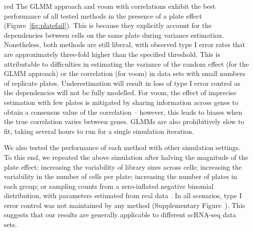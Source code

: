 \documentclass[oupdraft]{bio}
\begin{document}
\begin{color}{red}
The GLMM approach and voom with correlations exhibit the best performance of all tested methods in the presence of a plate effect (Figure~\ref{fig:platefail}).
This is because they explicitly account for the dependencies between cells on the same plate during variance estimation.
Nonetheless, both methods are still liberal, with observed type I error rates that are approximately three-fold higher than the specified threshold.
This is attributable to difficulties in estimating the variance of the random effect (for the GLMM approach) or the correlation (for voom) in data sets with small numbers of replicate plates.
Underestimation will result in loss of type I error control as the dependencies will not be fully modelled.
For voom, the effect of imprecise estimation with few plates is mitigated by sharing information across genes to obtain a consensus value of the correlation -- however, this leads to biases when the true correlation varies between genes.
GLMMs are also prohibitively slow to fit, taking several hours to run for a single simulation iteration.


We also tested the performance of each method with other simulation settings.
To this end, we repeated the above simulation after halving the magnitude of the plate effect; increasing the variability of library sizes across cells; increasing the variability in the number of cells per plate; increasing the number of plates in each group; or sampling counts from a zero-inflated negative binomial distribution, with parameters estimated from real data \citep{zeilis2008regression}.
In all scenarios, type I error control was not maintained by any method (Supplementary Figure~\suppfailsim{}).
This suggests that our results are generally applicable to different scRNA-seq data sets.
\end{color}
\end{document}
